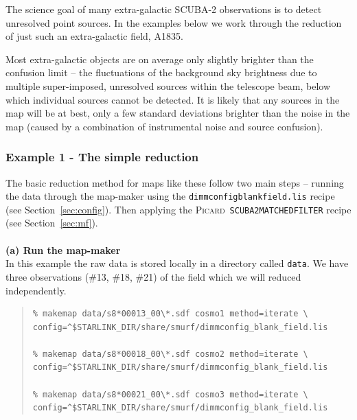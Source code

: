\documentclass[twoside,11pt]{article}
\newcommand{\htmlref}[2]{#1}
\newcommand{\latexhtml}[2]{#1}
\newcommand{\xref}[3]{#1}
\renewcommand{\_}{\texttt{\symbol{95}}}
\newenvironment{myquote}{\begin{quote}\begin{small}}{\end{small}\end{quote}}
\newcommand{\picard}{\xref{\textsc{Picard}}{sun265}{}}
\newcommand{\drrecipe}[1]{\texttt{#1}}
\newcommand{\cref}[3]{\latexhtml{#1~\ref{#2}}{\htmlref{#3}{#2}}}
\begin{document}
The science goal of many extra-galactic SCUBA-2 observations is to
detect unresolved point sources. In the examples below we work through the
reduction of just such an extra-galactic field, A1835.

Most extra-galactic objects are on average only slightly brighter than
the confusion limit -- the fluctuations of the background sky
brightness due to multiple super-imposed, unresolved sources within
the telescope beam, below which individual sources cannot be detected.
It is likely that any sources in the map will be at best, only a few
standard deviations brighter than the noise in the map (caused by a
combination of instrumental noise and source confusion).

\subsubsection{Example 1 - The simple reduction}
The basic reduction method for maps like these follow two main
steps -- running the data through the map-maker using the
\texttt{dimmconfig\_blank\_field.lis} recipe (see
\cref{Section}{sec:config}{Specialised configuration files}). Then
applying the \picard\ \drrecipe{SCUBA2\_MATCHED\_FILTER} recipe (see
\cref{Section}{sec:mf}{Point-source extraction}).
\\ \\
\textbf{(a) Run the map-maker}\\
In this example the raw data is stored locally in a directory called
\texttt{data}. We have three observations (\#13, \#18, \#21) of the field
which we will reduced independently.

\begin{myquote}
\begin{verbatim}
% makemap data/s8*00013_00\*.sdf cosmo1 method=iterate \
config=^$STARLINK_DIR/share/smurf/dimmconfig_blank_field.lis

% makemap data/s8*00018_00\*.sdf cosmo2 method=iterate \
config=^$STARLINK_DIR/share/smurf/dimmconfig_blank_field.lis

% makemap data/s8*00021_00\*.sdf cosmo3 method=iterate \
config=^$STARLINK_DIR/share/smurf/dimmconfig_blank_field.lis

\end{verbatim}
\end{myquote}
\end{document}
